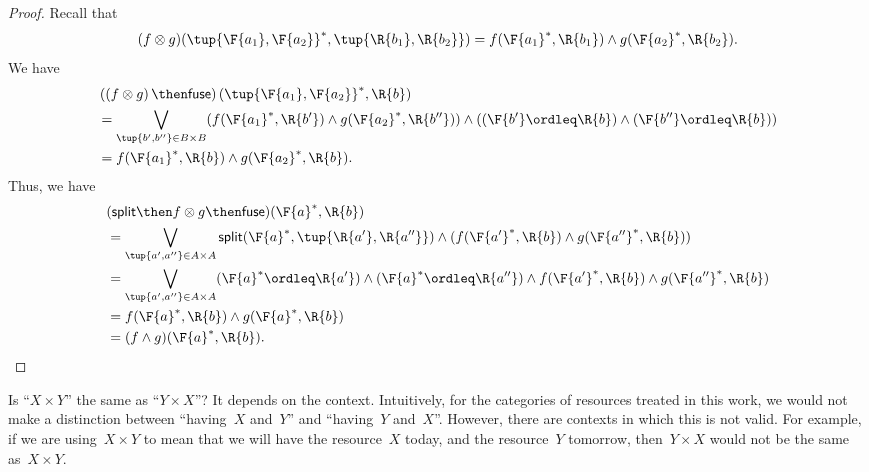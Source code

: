 \begin{proof}
    Recall that
    \begin{equation}
        (f\otimes g)(\tup{\F{a_1},\F{a_2}}^*,\tup{\R{b_1},\R{b_2}})
        =f(\F{a_1}^*,\R{b_1})\wedge g(\F{a_2}^*,\R{b_2}).
    \end{equation}
    We have
    \begin{equation}
        \begin{aligned}
             & \left(\left(f\otimes g\right) \then \mathsf{fuse}\right)(\tup{\F{a_1},\F{a_2}}^*,\R{b})                                                          \\
             & =\bigvee_{\tup{b',b''}\in B\times B}(f(\F{a_1}^*,\R{b'})\wedge g(\F{a_2}^*,\R{b''}))\wedge ((\F{b'}\ordleq \R{b}) \wedge (\F{b''}\ordleq \R{b})) \\
             & =f(\F{a_1}^*,\R{b})\wedge g(\F{a_2}^*,\R{b}).
        \end{aligned}
    \end{equation}
    Thus, we have
    \begin{equation}
        \begin{aligned}
             & (\mathsf{split}\then f\otimes g\then \mathsf{fuse})(\F{a}^*,\R{b})                                                                          \\&=\bigvee_{\tup{a',a''}\in A\times A} \mathsf{split}(\F{a}^*,\tup{\R{a'},\R{a''}})\wedge (f(\F{a'}^*,\R{b})\wedge g(\F{a''}^*,\R{b}))\\
             & =\bigvee_{\tup{a',a''}\in A\times A}(\F{a}^*\ordleq \R{a'})\wedge (\F{a}^*\ordleq \R{a''})\wedge f(\F{a'}^*,\R{b})\wedge g(\F{a''}^*,\R{b}) \\
             & =f(\F{a}^*,\R{b})\wedge g(\F{a}^*,\R{b})                                                                                                    \\
             & =(f\wedge g)(\F{a}^*,\R{b}).
        \end{aligned}
    \end{equation}
\end{proof}

Is ``$X \times Y$'' the same as ``$Y \times X$''?
It depends on the context.
Intuitively, for the categories of resources treated in this work, we would not make a distinction between ``having~$X$ and~$Y$'' and ``having~$Y$ and~$X$''.
However, there are contexts in which this is not valid.
For example, if we are using~$X \times Y$ to mean that we will have the resource~$X$ today, and the resource~$Y$ tomorrow, then~$Y \times X$ would not be the same as~$X \times Y$.

